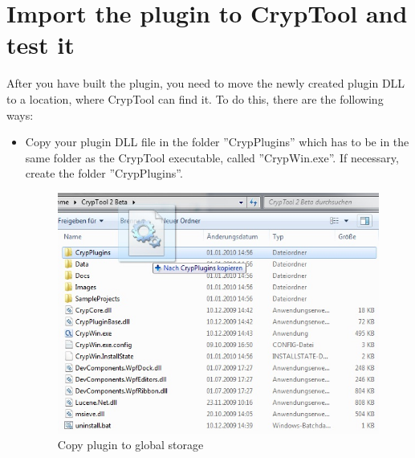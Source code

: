 \section{Import the plugin to CrypTool and test it}\label{sec:ImportThePluginToCryptoolAndTestIt}
After you have built the plugin, you need to move the newly created plugin DLL to a location, where CrypTool can find it. To do this, there are the following ways:
\begin{itemize}
	\item Copy your plugin DLL file in the folder ''CrypPlugins'' which has to be in the same folder as the CrypTool executable, called ''CrypWin.exe''. If necessary, create the folder ''CrypPlugins''.
\begin{figure}[h]
	\centering
		\includegraphics{figures/copy_dll_global_storage.jpg}
	\caption{Copy plugin to global storage}
	\label{fig:copy_dll_global_storage}
\end{figure}


\end{itemize}
